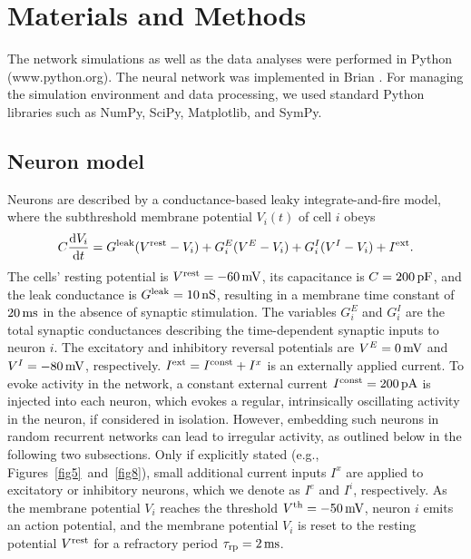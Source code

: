   \enlargethispage{3ex}



\section{Materials and Methods}
  The network simulations as well as the data analyses were performed in Python
  (www.python.org). The neural network was implemented in Brian
  \citep{Goodman2009}. For managing the simulation environment and data
  processing, we used standard Python libraries such as NumPy, SciPy,
  Matplotlib, and SymPy.
  \subsection{Neuron model}
    Neurons are described by a conductance-based leaky integrate-and-fire model,
    where the subthreshold membrane potential $V_i(t)$ of cell $i$ obeys
    \begin{equation}
      C\frac{{\rm d}V_i}{{\rm d}t} = G^{\rm leak}(V^{\rm rest}-V_i) + G_i^E(V^E-V_i) + G_i^I(V^I-V_i)  + I^{\rm ext} .
      \label{eq:IF}
    \end{equation}
    The cells' resting potential is $V^{\rm rest}=-60\, {\rm mV}$, its
    capacitance is $C = 200 \, {\rm pF}$, and the leak conductance is $G^{\rm
    leak}=10{\rm\, nS}$, resulting in a membrane time constant of $20 \, \rm
    ms$ in the absence of synaptic stimulation. The variables $G_i^E$ and
    $G_i^I$ are the total synaptic conductances describing the time-dependent
    synaptic inputs to neuron $i$. The excitatory and inhibitory reversal
    potentials are $V^E = 0\, {\rm mV}$ and $V^I=-80\, {\rm mV}$, respectively.
    $I^{\rm ext} = I^{\rm const} + I^x$ is an externally applied current. To
    evoke activity in the network, a constant external current $I^{\rm
    const}=200 \rm\, pA$ is injected into each neuron, which evokes a regular,
    intrinsically oscillating activity in the neuron, if considered in
    isolation. However, embedding such neurons in random recurrent networks can
    lead to irregular activity, as outlined below in the following two
    subsections. Only if explicitly stated (e.g.,
    Figures~\ref{fig5}~and~\ref{fig8}), small additional current inputs $I^{x}$
    are applied to excitatory or inhibitory neurons, which we denote as $I^e$
    and $I^i$, respectively. As the membrane potential $V_i$ reaches the
    threshold $V^{\rm th}=-50\, {\rm mV}$, neuron $i$ emits an action
    potential, and the membrane potential $V_i$ is reset to the resting
    potential $V^{\rm rest}$ for a refractory period $\tau_{\rm rp} = 2 \, {\rm
    ms}$.

